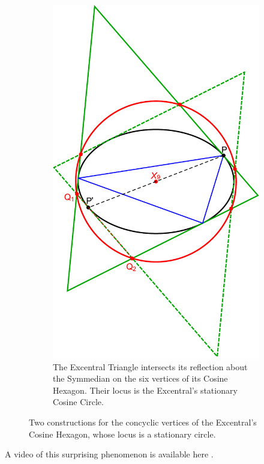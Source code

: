 \begin{figure}[H]
\begin{subfigure}[t]{0.45\textwidth}
         \includegraphics[width=1.0\linewidth]{pics/0120_cosine_circle_reflected_excentral.pdf}
    \caption{The Excentral Triangle intersects its reflection about the Symmedian on the six vertices of its Cosine Hexagon. Their locus is the Excentral's stationary Cosine Circle.}
    \label{fig:cosine_circle_excentral_hexagon}
     \end{subfigure}
     \caption{Two constructions for the concyclic vertices of the Excentral's Cosine Hexagon, whose locus is a stationary circle.}
\end{figure}

A video of this surprising phenomenon is available here \cite[video \#8]{dsr_main_videos_2019}.
